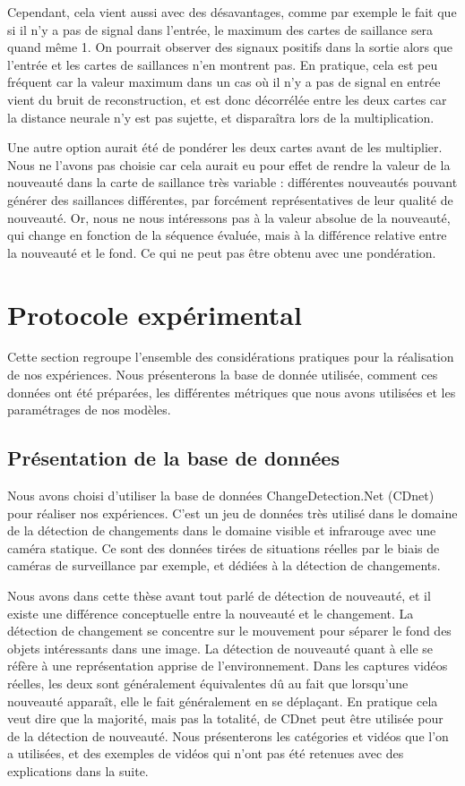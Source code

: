 	Cependant, cela vient aussi avec des désavantages, comme par exemple le fait que si il n'y a pas de signal dans l'entrée, le maximum des cartes de saillance sera quand même 1. On pourrait observer des signaux positifs dans la sortie alors que l'entrée et les cartes de saillances n'en montrent pas. En pratique, cela est peu fréquent car la valeur maximum dans un cas où il n'y a pas de signal en entrée vient du bruit de reconstruction, et est donc décorrélée entre les deux cartes car la distance neurale n'y est pas sujette, et disparaîtra lors de la multiplication.

	Une autre option aurait été de pondérer les deux cartes avant de les multiplier. Nous ne l'avons pas choisie car cela aurait eu pour effet de rendre la valeur de la nouveauté dans la carte de saillance très variable : différentes nouveautés pouvant générer des saillances différentes, par forcément représentatives de leur qualité de nouveauté. Or, nous ne nous intéressons pas à la valeur absolue de la nouveauté, qui change en fonction de la séquence évaluée, mais à la différence relative entre la nouveauté et le fond. Ce qui ne peut pas être obtenu avec une pondération.

	\newpage
	\section{Protocole expérimental}

	Cette section regroupe l'ensemble des considérations pratiques pour la réalisation de nos expériences. Nous présenterons la base de donnée utilisée, comment ces données ont été préparées, les différentes métriques que nous avons utilisées et les paramétrages de nos modèles.

	\subsection{Présentation de la base de données}

	Nous avons choisi d'utiliser la base de données ChangeDetection.Net (CDnet) \cite{wang-cdnet} pour réaliser nos expériences. C'est un jeu de données très utilisé dans le domaine de la détection de changements dans le domaine visible et infrarouge avec une caméra statique. Ce sont des données tirées de situations réelles par le biais de caméras de surveillance par exemple, et dédiées à la détection de changements.

	Nous avons dans cette thèse avant tout parlé de détection de nouveauté, et il existe une différence conceptuelle entre la nouveauté et le changement. La détection de changement se concentre sur le mouvement pour séparer le fond des objets intéressants dans une image. La détection de nouveauté quant à elle se réfère à une représentation apprise de l'environnement. Dans les captures vidéos réelles, les deux sont généralement équivalentes dû au fait que lorsqu'une nouveauté apparaît, elle le fait généralement en se déplaçant. En pratique cela veut dire que la majorité, mais pas la totalité, de CDnet peut être utilisée pour de la détection de nouveauté. Nous présenterons les catégories et vidéos que l'on a utilisées, et des exemples de vidéos qui n'ont pas été retenues avec des explications dans la suite.
	
